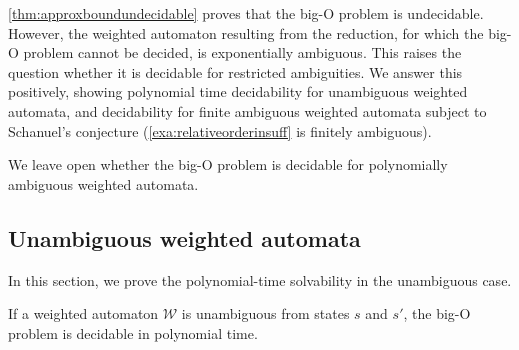 \documentclass[10pt,a4paper]{amsart}
\numberwithin{equation}{section}
\theoremstyle{plain}
\theoremstyle{definition}
\theoremstyle{remark}
\newcommand\wa{\mathcal{W}}
\begin{document}
\cref{thm:approxboundundecidable} proves that the big-O problem is undecidable. However, the weighted automaton resulting from the reduction, for which the big-O problem cannot be decided, is exponentially ambiguous. This raises the question whether it is decidable for restricted ambiguities. We answer this positively, showing polynomial time decidability for  unambiguous weighted automata, and decidability for finite ambiguous weighted automata subject to Schanuel's conjecture (\cref{exa:relativeorderinsuff} is finitely ambiguous).

We leave open whether the big-O problem is decidable for polynomially ambiguous weighted automata.

\subsection{Unambiguous weighted automata}

In this section, we prove the polynomial-time solvability in the unambiguous case.


\begin{thm}\label{thm:detpolly}
If a weighted automaton $\wa$ is unambiguous from states $s$ and $s'$, the big-O problem is decidable in polynomial time.
\end{thm}
\end{document}
